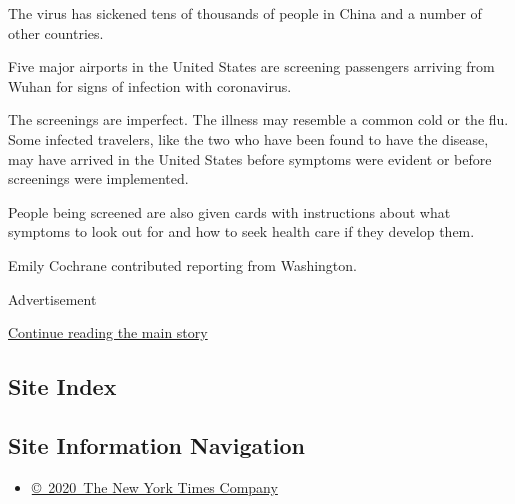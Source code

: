 The virus has sickened tens of thousands of people in China and a number
of other countries.

Five major airports in the United States are screening passengers
arriving from Wuhan for signs of infection with coronavirus.

The screenings are imperfect. The illness may resemble a common cold or
the flu. Some infected travelers, like the two who have been found to
have the disease, may have arrived in the United States before symptoms
were evident or before screenings were implemented.

People being screened are also given cards with instructions about what
symptoms to look out for and how to seek health care if they develop
them.

Emily Cochrane contributed reporting from Washington.

Advertisement

\protect\hyperlink{after-bottom}{Continue reading the main story}

\hypertarget{site-index}{%
\subsection{Site Index}\label{site-index}}

\hypertarget{site-information-navigation}{%
\subsection{Site Information
Navigation}\label{site-information-navigation}}

\begin{itemize}
\tightlist
\item
  \href{https://help.nytimes3xbfgragh.onion/hc/en-us/articles/115014792127-Copyright-notice}{©~2020~The
  New York Times Company}
\end{itemize}

